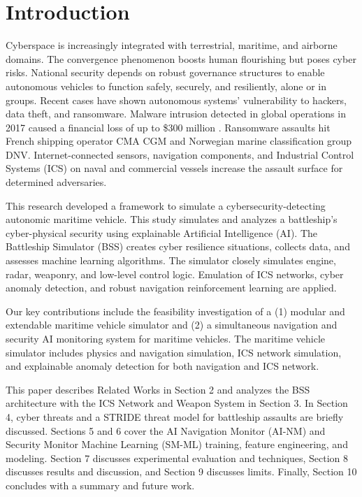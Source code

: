 \documentclass[conference]{IEEEtran}
\begin{document}
\section{Introduction}
Cyberspace is increasingly integrated with terrestrial, maritime, and airborne domains. The convergence phenomenon boosts human flourishing but poses cyber risks. National security depends on robust governance structures to enable autonomous vehicles to function safely, securely, and resiliently, alone or in groups. Recent cases have shown autonomous systems' vulnerability to hackers, data theft, and ransomware. Malware intrusion detected in global operations in 2017 caused a financial loss of up to \$300 million \cite{b2}. Ransomware assaults hit French shipping operator CMA CGM and Norwegian marine classification group DNV. Internet-connected sensors, navigation components, and Industrial Control Systems (ICS) on naval and commercial vessels increase the assault surface for determined adversaries.

This research developed a framework to simulate a cybersecurity-detecting autonomic maritime vehicle. This study simulates and analyzes a battleship's cyber-physical security using explainable Artificial Intelligence (AI). The Battleship Simulator (BSS) creates cyber resilience situations, collects data, and assesses machine learning algorithms. The simulator closely simulates engine, radar, weaponry, and low-level control logic. Emulation of ICS networks, cyber anomaly detection, and robust navigation reinforcement learning are applied.

Our key contributions include the feasibility investigation of a (1) modular and extendable maritime vehicle simulator and (2) a simultaneous navigation and security AI monitoring system for maritime vehicles. The maritime vehicle simulator includes physics and navigation simulation, ICS network simulation, and explainable anomaly detection for both navigation and ICS network. 

This paper describes Related Works in Section 2 and analyzes the BSS architecture with the ICS Network and Weapon System in Section 3.  In Section 4, cyber threats and a STRIDE threat model for battleship assaults are briefly discussed. Sections 5 and 6 cover the AI Navigation Monitor (AI-NM) and Security Monitor Machine Learning (SM-ML) training, feature engineering, and modeling. Section 7 discusses experimental evaluation and techniques, Section 8 discusses results and discussion, and Section 9 discusses limits.  Finally, Section 10 concludes with a summary and future work.
\end{document}
